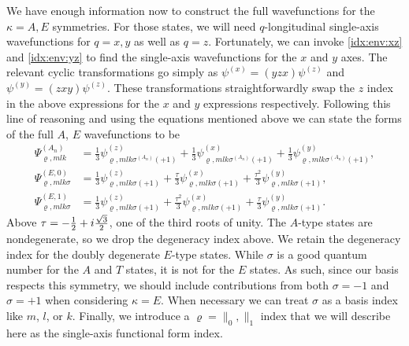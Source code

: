 We have enough information now to construct the full wavefunctions for the
$\kappa = A,E$ symmetries. For those states, we will need $q$-longitudinal
single-axis wavefunctions for $q = x, y$ as well as $q = z$. Fortunately, we can
invoke \eqref{idx:env:xz} and \eqref{idx:env:yz} to find the single-axis
wavefunctions for the $x$ and $y$ axes. The relevant cyclic transformations go
simply as $\psi^{\left(x\right)} = \left(yzx\right)\psi^{\left(z\right)}$ and
$\psi^{\left(y\right)} = \left(zxy\right)\psi^{\left(z\right)}$. These
transformations straightforwardly swap the $z$ index in the above expressions
for the $x$ and $y$ expressions respectively. Following this line of reasoning
and using the equations mentioned above we can state the forms of the full $A$,
$E$ wavefunctions to be
\begin{align}
    \Psi_{\varrho,mlk}^{\left(A_{n}\right)}
        &=
            \frac{1}{3}
            \psi_{\varrho,mlk\sigma^{\left(A_{n}\right)}\left(+1\right)}
            ^{\left(z\right)}
                +
            \frac{1}{3}
            \psi_{\varrho,mlk\sigma^{\left(A_{n}\right)}\left(+1\right)}
            ^{\left(x\right)}
                +
            \frac{1}{3}
            \psi_{\varrho,mlk\sigma^{\left(A_{n}\right)}\left(+1\right)}
            ^{\left(y\right)}
\label{wavefunction:A}
,\\
    \Psi_{\varrho,mlk\sigma}^{\left(E,0\right)}
        &=
            \frac{1}{3}
            \psi_{\varrho,mlk\sigma\left(+1\right)}^{\left(z\right)}
                +
            \frac{\tau}{3}
            \psi_{\varrho,mlk\sigma\left(+1\right)}^{\left(x\right)}
                +
            \frac{\tau^{2}}{3}
            \psi_{\varrho,mlk\sigma\left(+1\right)}^{\left(y\right)}
\label{wavefunction:E:0}
,\\
    \Psi_{\varrho,mlk\sigma}^{\left(E,1\right)}
        &=
            \frac{1}{3}
            \psi_{\varrho,mlk\sigma\left(+1\right)}^{\left(z\right)}
                +
            \frac{\tau^{2}}{3}
            \psi_{\varrho,mlk\sigma\left(+1\right)}^{\left(x\right)}
                +
            \frac{\tau}{3}
            \psi_{\varrho,mlk\sigma\left(+1\right)}^{\left(y\right)}
\label{wavefunction:E:1}
.
\end{align}
Above $\tau = -\frac{1}{2} + i\frac{\sqrt{3}}{2}$, one of the third roots of
unity. The $A$-type states are nondegenerate, so we drop the degeneracy index
above. We retain the degeneracy index for the doubly degenerate $E$-type states.
While $\sigma$ is a good quantum number for the $A$ and $T$ states, it is not
for the $E$ states. As such, since our basis respects this symmetry, we should
include contributions from both $\sigma=-1$ and $\sigma=+1$ when considering
$\kappa = E$. When necessary we can treat $\sigma$ as a basis index like $m$,
$l$, or $k$. Finally, we introduce a $\varrho = \parallel_{0}, \parallel_{1}$
index that we will describe here as the single-axis functional form index.

